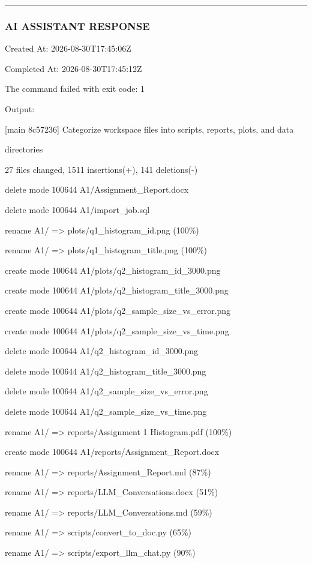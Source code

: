 \documentclass[11pt,a4paper]{article}
\begin{document}
{\hrule

\subsubsection{AI ASSISTANT RESPONSE}

Created At: 2026-08-30T17:45:06Z

Completed At: 2026-08-30T17:45:12Z


The command failed with exit code: 1

Output:

[main 8c57236] Categorize workspace files into scripts, reports, plots, and data

directories

27 files changed, 1511 insertions(+), 141 deletions(-)

delete mode 100644 A1/Assignment\_Report.docx

delete mode 100644 A1/import\_job.sql

rename A1/{ => plots}/q1\_histogram\_id.png (100\%)

rename A1/{ => plots}/q1\_histogram\_title.png (100\%)

create mode 100644 A1/plots/q2\_histogram\_id\_3000.png

create mode 100644 A1/plots/q2\_histogram\_title\_3000.png

create mode 100644 A1/plots/q2\_sample\_size\_vs\_error.png

create mode 100644 A1/plots/q2\_sample\_size\_vs\_time.png

delete mode 100644 A1/q2\_histogram\_id\_3000.png

delete mode 100644 A1/q2\_histogram\_title\_3000.png

delete mode 100644 A1/q2\_sample\_size\_vs\_error.png

delete mode 100644 A1/q2\_sample\_size\_vs\_time.png

rename A1/{ => reports}/Assignment 1 Histogram.pdf (100\%)

create mode 100644 A1/reports/Assignment\_Report.docx

rename A1/{ => reports}/Assignment\_Report.md (87\%)

rename A1/{ => reports}/LLM\_Conversations.docx (51\%)

rename A1/{ => reports}/LLM\_Conversations.md (59\%)

rename A1/{ => scripts}/convert\_to\_doc.py (65\%)

rename A1/{ => scripts}/export\_llm\_chat.py (90\%)

}
\end{document}
